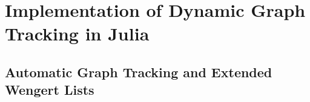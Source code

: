 \chapter{Implementation of Dynamic Graph Tracking in Julia}
\label{cha:impl-dynam-graph}


\section{Automatic Graph Tracking and Extended Wengert Lists}
\label{sec:autom-graph-track}



